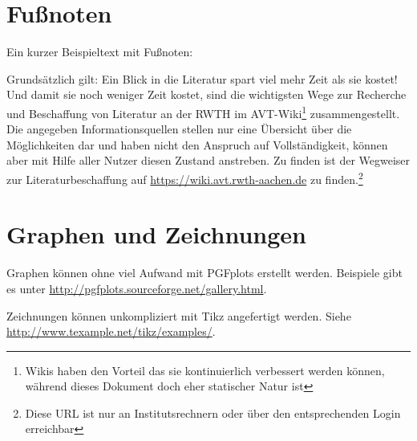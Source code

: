 \section{Fußnoten}
Ein kurzer Beispieltext mit Fußnoten:

Grundsätzlich gilt: Ein Blick in die Literatur spart viel mehr
Zeit als sie kostet! Und damit sie noch weniger Zeit kostet, sind
die wichtigsten Wege zur Recherche und Beschaffung von Literatur
an der RWTH im AVT-Wiki\footnote{Wikis haben den Vorteil das sie
kontinuierlich verbessert werden können, während dieses Dokument
doch eher statischer Natur ist} zusammengestellt. Die angegeben
Informationsquellen stellen nur eine Übersicht über die
Möglichkeiten dar und haben nicht den Anspruch auf
Vollständigkeit, können aber mit Hilfe aller Nutzer diesen Zustand
anstreben. Zu finden ist der Wegweiser zur Literaturbeschaffung
auf
\url{https://wiki.avt.rwth-aachen.de}
zu finden.\footnote{Diese URL ist nur an Institutsrechnern oder
über den entsprechenden Login erreichbar}

\section{Graphen und Zeichnungen}

Graphen können ohne viel Aufwand mit PGFplots erstellt werden. Beispiele gibt es unter \url{http://pgfplots.sourceforge.net/gallery.html}.
\begin{center}
\end{center}

Zeichnungen können unkompliziert mit Tikz angefertigt werden. Siehe \url{http://www.texample.net/tikz/examples/}.
\begin{center}
\end{center}

